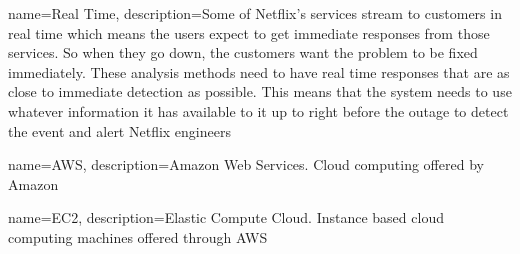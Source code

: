 \documentclass[12pt]{ucthesis}
\begin{document}
      {name={Real Time},
       description={Some of Netflix's services stream to customers in real time which means the
                    users expect to get immediate responses from those services. So when
                    they go down, the customers want the problem to be fixed immediately. These
                    analysis methods need to have real time responses that are as close to
                    immediate detection as possible. This means that the system needs to use
                    whatever information it has available to it up to right before the outage to
                    detect the event and alert Netflix engineers}}

      {name={AWS},
       description={Amazon Web Services. Cloud computing offered by Amazon}}

      {name={EC2},
       description={Elastic Compute Cloud. Instance based cloud computing machines offered through AWS}}

\end{document}
